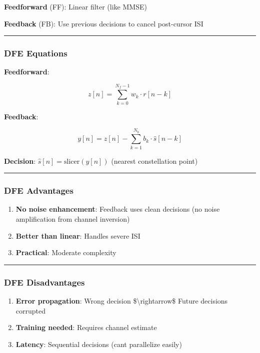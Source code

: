 \textbf{Feedforward} (FF): Linear filter (like MMSE)

\textbf{Feedback} (FB): Use previous decisions to cancel post-cursor ISI

\begin{center}\rule{0.5\linewidth}{0.5pt}\end{center}

\subsubsection{DFE Equations}\label{dfe-equations}

\textbf{Feedforward}:

\[
z[n] = \sum_{k=0}^{N_f-1} w_k \cdot r[n-k]
\]

\textbf{Feedback}:

\[
y[n] = z[n] - \sum_{k=1}^{N_b} b_k \cdot \hat{s}[n-k]
\]

\textbf{Decision}: \(\hat{s}[n] = \text{slicer}(y[n])\) (nearest
constellation point)

\begin{center}\rule{0.5\linewidth}{0.5pt}\end{center}

\subsubsection{DFE Advantages}\label{dfe-advantages}

\begin{enumerate}
\def\labelenumi{\arabic{enumi}.}
\tightlist
\item
  \textbf{No noise enhancement}: Feedback uses clean decisions (no noise
  amplification from channel inversion)
\item
  \textbf{Better than linear}: Handles severe ISI
\item
  \textbf{Practical}: Moderate complexity
\end{enumerate}

\begin{center}\rule{0.5\linewidth}{0.5pt}\end{center}

\subsubsection{DFE Disadvantages}\label{dfe-disadvantages}

\begin{enumerate}
\def\labelenumi{\arabic{enumi}.}
\tightlist
\item
  \textbf{Error propagation}: Wrong decision
  \$\textbackslash rightarrow\$ Future decisions corrupted
\item
  \textbf{Training needed}: Requires channel estimate
\item
  \textbf{Latency}: Sequential decisions (can\textquotesingle t
  parallelize easily)
\end{enumerate}

